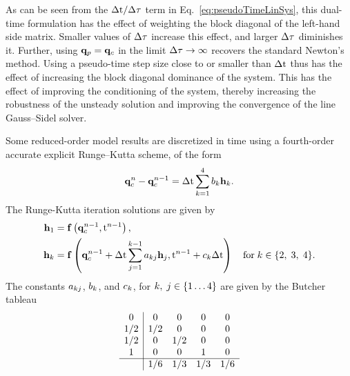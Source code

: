 As can be seen from the $\Delta \text{t}/\Delta \tau$ term in Eq.~\ref{eq:pseudoTimeLinSys}, this dual-time formulation has the effect of weighting the block diagonal of the left-hand side matrix. Smaller values of $\Delta \tau$ increase this effect, and larger $\Delta \tau$ diminishes it. Further, using $\mathbf{q}_p = \mathbf{q}_c$ in the limit $\Delta \tau \rightarrow \infty$ recovers the standard Newton's method. Using a pseudo-time step size close to or smaller than $\Delta \text{t}$ thus has the effect of increasing the block diagonal dominance of the system. This has the effect of improving the conditioning of the system, thereby increasing the robustness of the unsteady solution and improving the convergence of the line Gauss--Sidel solver.

Some reduced-order model results are discretized in time using a fourth-order accurate explicit Runge--Kutta scheme, of the form
%
\begin{equation}\label{eq:expRK}
    \mathbf{q}_c^{n} - \mathbf{q}_c^{n-1} = \Delta \text{t} \sum_{k = 1}^{4} b_{k} \mathbf{h}_{k}.
\end{equation}
%
The Runge-Kutta iteration solutions are given by
%
\begin{align}
    \mathbf{h}_1 &= \mathbf{f} \left(\mathbf{q}_c^{n - 1}, \text{t}^{n-1}\right), \\
    \mathbf{h}_{k} &= \mathbf{f} \left(\mathbf{q}_c^{n-1} + \Delta \text{t} \sum_{j = 1}^{k-1} a_{k j} \mathbf{h}_{j}, \text{t}^{n-1} + c_{k} \Delta \text{t}\right) \quad \text{for} \; k \in \{2, \; 3, \; 4\}.
\end{align}
%
The constants $a_{k j}$, $b_{k}$, and $c_{k}$, for $k, \; j \in \{1 \hdots 4\}$ are given by the Butcher tableau
%
\[
    \begin{array}
		{c|cccc}
		0 & 0 & 0 & 0 & 0 \\
		1/2 & 1/2 & 0 & 0 & 0 \\
		1/2 & 0 & 1/2 & 0 & 0 \\
		1 & 0 & 0 & 1 & 0 \\
		\hline
		& 1/6 & 1/3 & 1/3 & 1/6
    \end{array}
\]
%